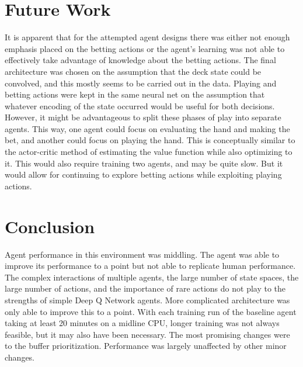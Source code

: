 \documentclass[10pt]{article} %
\begin{document}

\section{Future Work}

It is apparent that for the attempted agent designs there was either not enough emphasis placed on the betting actions or the agent's learning was not able to effectively take advantage of knowledge about the betting actions. The final architecture was chosen on the assumption that the deck state could be convolved, and this mostly seems to be carried out in the data. Playing and betting actions were kept in the same neural net on the assumption that whatever encoding of the state occurred would be useful for both decisions. However, it might be advantageous to split these phases of play into separate agents. This way, one agent could focus on evaluating the hand and making the bet, and another could focus on playing the hand. This is conceptually similar to the actor-critic method of estimating the value function while also optimizing to it. This would also require training two agents, and may be quite slow. But it would allow for continuing to explore betting actions while exploiting playing actions.

\section{Conclusion}

Agent performance in this environment was middling. The agent was able to improve its performance to a point but not able to replicate human performance. The complex interactions of multiple agents, the large number of state spaces, the large number of actions, and the importance of rare actions do not play to the strengths of simple Deep Q Network agents. More complicated architecture was only able to improve this to a point. With each training run of the baseline agent taking at least 20 minutes on a midline CPU, longer training was not always feasible, but it may also have been necessary. The most promising changes were to the buffer prioritization. Performance was largely unaffected by other minor changes.

\newpage
\end{document}
